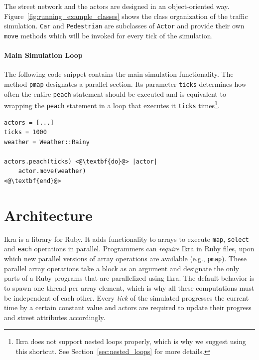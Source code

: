 \documentclass[preprint]{sigplanconf}
\begin{document}
The street network and the actors are designed in an object-oriented way. Figure~\ref{fig:running_example_classes} shows the class organization of the traffic simulation. \texttt{Car} and \texttt{Pedestrian} are subclasses of \texttt{Actor} and provide their own \texttt{move} methods which will be invoked for every tick of the simulation. 

\paragraph{Main Simulation Loop}
The following code snippet contains the main simulation functionality. The method \texttt{pmap} designates a parallel section. Its parameter \texttt{ticks} determines how often the entire \texttt{peach} statement should be executed and is equivalent to wrapping the \texttt{peach} statement in a loop that executes it \texttt{ticks} times\footnote{Ikra does not support nested loops properly, which is why we suggest using this shortcut. See Section~\ref{sec:nested_loops} for more details.}.

\begin{lstlisting}
actors = [...]
ticks = 1000
weather = Weather::Rainy

actors.peach(ticks) <@\textbf{do}@> |actor|
    actor.move(weather)
<@\textbf{end}@>
\end{lstlisting}


\section{Architecture}
Ikra is a library for Ruby. It adds functionality to arrays to execute \texttt{map}, \texttt{select} and \texttt{each} operations in parallel. Programmers can \emph{require} Ikra in Ruby files, upon which new parallel versions of array operations are available (e.g., \texttt{pmap}). These parallel array operations take a block as an argument and designate the only parts of a Ruby programs that are parallelized using Ikra. The default behavior is to spawn one thread per array element, which is why all these computations must be independent of each other. Every \emph{tick} of the simulated progresses the current time by a certain constant value and actors are required to update their progress and street attributes accordingly.
\end{document}
